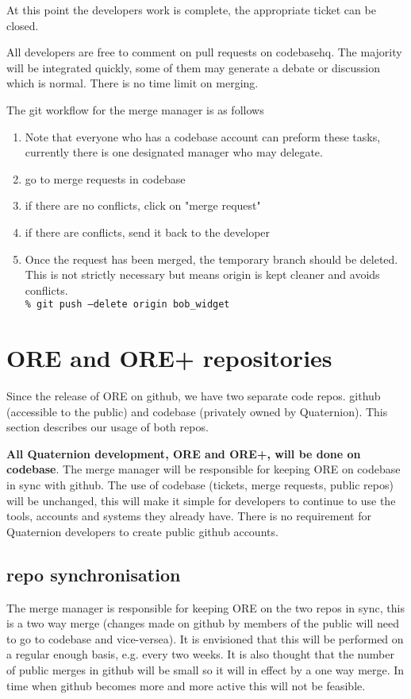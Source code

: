 \documentclass[12pt, a4paper]{article}
\begin{document}
At this point the developers work is complete, the appropriate ticket can be closed.

All developers are free to comment on pull requests on codebasehq. The majority will be integrated quickly, some of them may generate a debate or discussion which is normal. There is no time limit on merging.


The git workflow for the merge manager is as follows
\begin{enumerate}
\item Note that everyone who has a codebase account can preform these tasks, currently there is one designated manager who may delegate.
\item go to merge requests in codebase
\item if there are no conflicts, click on "merge request"
\item if there are conflicts, send it back to the developer
\item Once the request has been merged, the temporary branch should be deleted. This is not strictly necessary but means origin is kept cleaner and avoids conflicts.\\
 \texttt{\% git push --delete origin bob\_widget}
\end{enumerate}

\break
\section*{ORE and ORE+ repositories}
Since the release of ORE on github, we have two separate code repos. github (accessible to the public) and codebase (privately owned by Quaternion). This section describes our usage of both repos.

\textbf{All Quaternion development, ORE and ORE+, will be done on codebase}. The merge manager will be responsible for keeping ORE on codebase in sync with github. The use of codebase (tickets, merge requests, public repos) will be unchanged, this will make it simple for developers to continue to use the tools, accounts and systems they already have. There is no requirement for Quaternion developers to create public github accounts.

\subsection*{repo synchronisation}
The merge manager is responsible for keeping ORE on the two repos in sync, this is a two way merge (changes made on github by members of the public will need to go to codebase and vice-versea). It is envisioned that this will be performed on a regular enough basis, e.g. every two weeks. It is also thought that the number of public merges in github will be small so it will in effect by a one way merge. In time when github becomes more and more active this will not be feasible.
\end{document}
